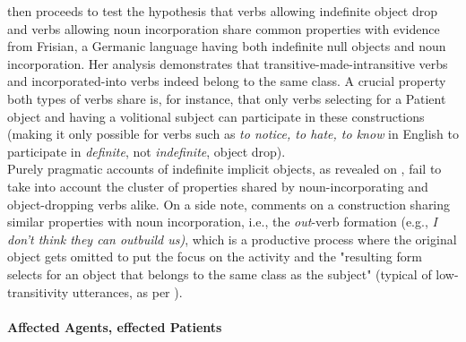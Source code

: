 \textcite[461-463]{Marti2015} then proceeds to test the hypothesis that verbs allowing indefinite object drop and verbs allowing noun incorporation share common properties with evidence from Frisian, a Germanic language having both indefinite null objects and noun incorporation. Her analysis demonstrates that transitive-made-intransitive verbs and incorporated-into verbs indeed belong to the same class. A crucial property both types of verbs share is, for instance, that only verbs selecting for a Patient object and having a volitional subject can participate in these constructions (making it only possible for verbs such as \textit{to notice, to hate, to know} in English to participate in \textit{definite}, not \textit{indefinite}, object drop).\\
Purely pragmatic accounts of indefinite implicit objects, as revealed on , fail to take into account the cluster of properties shared by noun-incorporating and object-dropping verbs alike. On a side note, \textcite[249]{Mittwoch2005} comments on a construction sharing similar properties with noun incorporation, i.e., the \textit{out}-verb formation (e.g., \textit{I don't think they can outbuild us)}, which is a productive process where the original object gets omitted to put the focus on the activity and the "resulting form selects for an object that belongs to the same class as the subject" (typical of low-transitivity utterances, as per \textcite{HopperThompson1980}).


\paragraph{Affected Agents, effected Patients} 

